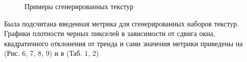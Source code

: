 \documentclass[a4paper]{article}
\begin{document}
\begin{figure}
\begin{minipage}{0.3\linewidth}
				\end{minipage}
				\hfill
				\begin{minipage}{0.3\linewidth}
				\end{minipage}
				\caption{Примеры сгенерированных текстур}
			\end{figure}
			Была подсчитана введенная метрика для сгенерированных наборов текстур. Графики плотности черных пикселей в зависимости от сдвига окна, квадратичного отклонения от тренда и сами значения метрики приведены на (Рис. 6, 7, 8, 9) и в (Таб. 1, 2)
\end{document}
